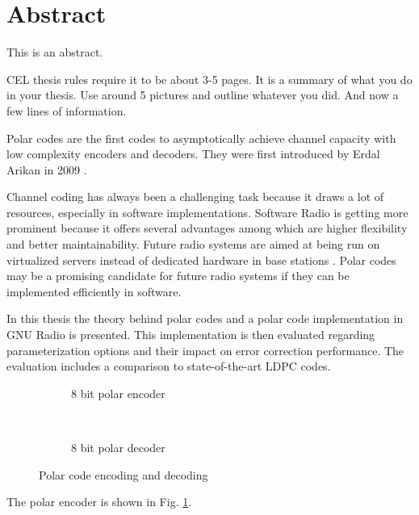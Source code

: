 \chapter*{Abstract}
This is an abstract.

CEL thesis rules require it to be about 3-5 pages. 
It is a summary of what you do in your thesis.
Use around 5 pictures and outline whatever you did.
And now a few lines of information.


Polar codes are the first codes to asymptotically achieve channel capacity with low complexity encoders and decoders.
They were first introduced by Erdal Arikan in 2009 \cite{polar:arikan09}.

Channel coding has always been a challenging task because it draws a lot of resources, especially in software implementations.
Software Radio is getting more prominent because it offers several advantages among which are higher flexibility and better maintainability.
Future radio systems are aimed at being run on virtualized servers instead of dedicated hardware in base stations \cite{cloudran:2015}.
Polar codes may be a promising candidate for future radio systems if they can be implemented efficiently in software.

In this thesis the theory behind polar codes and a polar code implementation in GNU Radio is presented.
This implementation is then evaluated regarding parameterization options and their impact on error correction performance.
The evaluation includes a comparison to state-of-the-art \ac{LDPC} codes.


\begin{figure}[!htb]
  \begin{subfigure}[t]{.49\textwidth}
    \begin{center}
      \def\dist{1.5}
      \def\power{3}
      
      \caption{8 bit polar encoder}
      \label{abs:polar_8bit_encoder_natural}
    \end{center}
  \end{subfigure}\,%
  \begin{subfigure}[t]{.49\textwidth}
    \begin{center}
      \def\dist{1.5}
      \def\power{3}
      
      \caption{8 bit polar decoder}
      \label{abs:polar_8bit_decoder}
    \end{center}
  \end{subfigure}%
  \caption{Polar code encoding and decoding}
  \label{abs:encoder-decoder}
\end{figure}

The polar encoder is shown in Fig. \ref{abs:polar_8bit_encoder_natural}.


